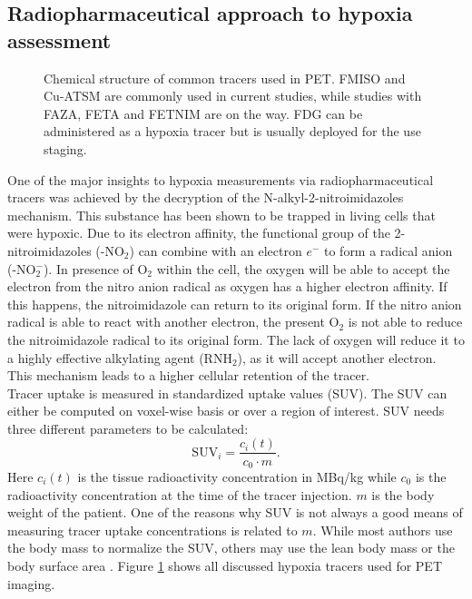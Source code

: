 \subsection{Radiopharmaceutical approach to hypoxia assessment}\label{chap:tracers}
\begin{figure}[p]
\centering
{}
\hspace{0.3cm}
\hspace{0.3cm}
\hspace{0.3cm}
\hspace{0.3cm}
\caption{Chemical structure of common tracers used in PET. FMISO and Cu-ATSM are commonly used in current studies, while studies with FAZA, FETA and FETNIM are on the way. FDG can be administered as a hypoxia tracer but is usually deployed for the use staging.}
\label{fig:hypoxiatracer}
\end{figure}
One of the major insights to hypoxia measurements via radiopharmaceutical tracers was achieved by the decryption of the N-alkyl-2-nitroimidazoles mechanism. This substance has been shown to be trapped in living cells that were hypoxic. Due to its electron affinity, the functional group of the 2-nitroimidazoles (-NO$_2$) can combine with an electron $e^-$ to form a radical anion (-NO$_2^-$). In presence of O$_2$ within the cell, the oxygen will be able to accept the electron from the nitro anion radical as oxygen has a higher electron affinity. If this happens, the nitroimidazole can return to its original form. If the nitro anion radical is able to react with another electron, the present O$_2$ is not able to reduce the nitroimidazole radical to its original form. The lack of oxygen will reduce it to a highly effective alkylating agent (RNH$_2$), as it will accept another electron. This mechanism leads to a higher cellular retention of the tracer.\\Tracer uptake is measured in standardized uptake values (SUV). The SUV can either be computed on voxel-wise basis or over a region of interest. SUV needs three different parameters to be calculated:
\begin{equation}
\mathrm{SUV}_i = \frac{c_i(t)}{c_0\cdot m}.
\end{equation}
Here $c_i(t)$ is the tissue radioactivity concentration in MBq/kg while $c_0$ is the radioactivity concentration at the time of the tracer injection. $m$ is the body weight of the patient. One of the reasons why SUV is not always a good means of measuring tracer uptake concentrations is related to $m$. While most authors use the body mass to normalize the SUV, others may use the lean body mass \cite{pmid8234714} or the body surface area \cite{pmid8271040}. Figure \ref{fig:hypoxiatracer} shows all discussed hypoxia tracers used for PET imaging.
